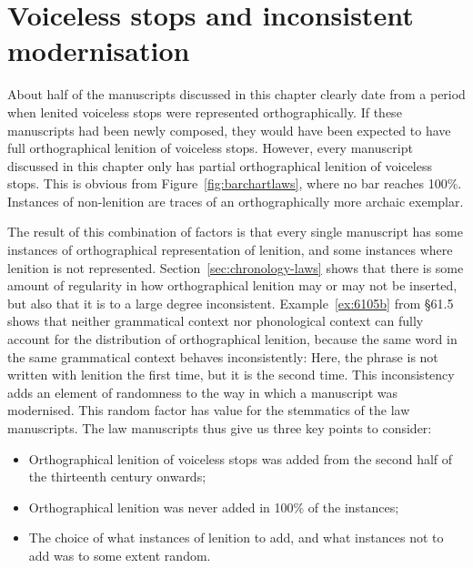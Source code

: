 

\section{Voiceless stops and inconsistent modernisation}
\label{sec:voiceless-stops}
About half of the manuscripts discussed in this chapter clearly date from a period when lenited voiceless stops were represented orthographically. If these manuscripts had been newly composed, they would have been expected to  have full orthographical lenition of voiceless stops. However, every manuscript discussed in this chapter only has partial orthographical lenition of voiceless stops. This is obvious from Figure~\ref{fig:barchartlaws}, where no bar reaches 100\%. Instances of non-lenition are traces of an orthographically more archaic exemplar.

The result of this combination of factors is that every single  manuscript has some instances of orthographical representation of lenition, and some instances where lenition is not represented. Section~\ref{sec:chronology-laws} shows that there is some amount of regularity in how orthographical lenition may or may not be inserted, but also that it is to a large degree inconsistent. Example~\ref{ex:6105b} from \S 61.5 shows that neither grammatical context nor phonological context can fully account for the distribution of orthographical lenition, because the same word in the same grammatical context behaves inconsistently:
Here, the phrase  is not written with lenition the first time, but it is the second time. This inconsistency adds an element of randomness to the way in which a manuscript was modernised. This random factor has value for the stemmatics of the law manuscripts. The law manuscripts thus give us three key points to consider:
\begin{itemize}
\item Orthographical lenition of voiceless stops was added from the second half of the thirteenth century onwards;
\item Orthographical lenition was never added in 100\% of the instances;
\item The choice of what instances of lenition to add, and what instances not to add was to some extent random.
\end{itemize}

